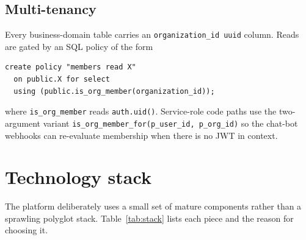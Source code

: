 \documentclass[11pt,a4paper,oneside]{article}
\newcommand{\code}[1]{\texttt{\small #1}}
\begin{document}
\subsection{Multi-tenancy}

Every business-domain table carries an
\code{organization\_id uuid} column. Reads are gated by an SQL
policy of the form
\begin{lstlisting}[language=SQL2]
create policy "members read X"
  on public.X for select
  using (public.is_org_member(organization_id));
\end{lstlisting}
where \code{is\_org\_member} reads \code{auth.uid()}. Service-role
code paths use the two-argument variant
\code{is\_org\_member\_for(p\_user\_id, p\_org\_id)} so the chat-bot
webhooks can re-evaluate membership when there is no JWT in context.

\section{Technology stack}\label{sec:tech}

The platform deliberately uses a small set of mature components rather
than a sprawling polyglot stack. Table~\ref{tab:stack} lists each
piece and the reason for choosing it.
\end{document}
